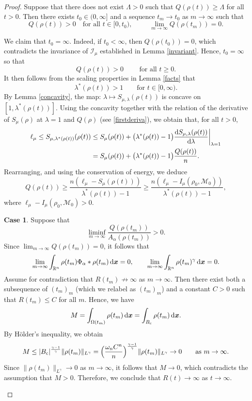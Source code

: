 \documentclass[reqno,11pt]{amsart}
\numberwithin{equation}{section}
\theoremstyle{definition}
\newtheorem{case}{Case}
\def\d{{\rm d}}
\def\dd{{\, \rm d}}
\begin{document}
\begin{proof}
Suppose that there does not exist $\Lambda > 0$ such that $Q(\rho(t)) \geq \Lambda$ 
for all $t>0$. Then there exists
$t_0 \in (0,\infty]$ and a sequence $t_m \to t_0$ as $m \to \infty$ such that 
$$
Q(\rho(t))> 0 \,\,\,\,\mbox{ for all $t \in [0,t_0)$}, \qquad\,\,\, 
\lim_{m \to \infty} Q(\rho(t_m)) = 0.
$$

We claim that $t_0 = \infty$. Indeed, if $t_0 < \infty$, then $Q(\rho(t_0)) = 0$, 
which contradicts the invariance of $\mathcal{I}_\mu$ established 
in Lemma \ref{invariant}. 
Hence, $t_0=\infty$ so that
$$
Q(\rho(t))> 0 \qquad\mbox{ for all $t\ge 0$}.
$$
It then follows from the scaling properties in Lemma \ref{facts}
that 
$$
\lambda^*(\rho(t)) > 1 \qquad\mbox{for $t \in [0,\infty)$}.
$$
By Lemma \ref{concavity}, the map: $\lambda \mapsto S_{\mu,\lambda}(\rho(t))$ is concave 
on $[1,\lambda^*(\rho(t))]$. Using the concavity together with 
the relation of the derivative of $S_\mu(\rho)$ 
at $\lambda=1$
and $Q(\rho)$ (see \eqref{firstderiva}), we obtain that, for all $t > 0$,
    \begin{align*}
 \ell_\mu \leq S_{\mu, \lambda^*(\rho(t))}(\rho(t)) 
 &\leq S_\mu(\rho(t)) 
 + \big(\lambda^*(\rho(t)) - 1\big)\frac{\d S_{\mu,\lambda}(\rho(t))}{\d \lambda} \bigg |_{\lambda = 1}\\ 
 &= S_\mu(\rho(t)) + \big(\lambda^*(\rho(t)) - 1\big) \frac{Q(\rho(t))}{n}.
    \end{align*}
    Rearranging, and using the conservation of energy, we deduce
    \begin{equation}\label{lamb}
    Q(\rho(t)) \geq \frac{n(\ell_\mu - S_\mu(\rho(t)))}{\lambda^*(\rho(t)) - 1} \geq \frac{n(\ell_\mu - I_\mu(\rho_0,\mathcal{M}_0))}{\lambda^*(\rho(t)) - 1},
    \end{equation}
where $\ell_\mu - I_\mu(\rho_0,\mathcal{M}_0) > 0$.
    

\begin{case}
Suppose that
    \begin{equation*}
 \liminf_{m \to \infty} \frac{Q(\rho(t_m))}{A_\alpha(\rho(t_m))} > 0.
    \end{equation*}
Since $\lim_{m \to \infty} Q(\rho(t_m)) = 0$, it follows that 
$$
\lim_{m \to \infty}\int_{\mathbb R^n}\rho(t_m)\Phi_\alpha*\rho(t_m)\dd \boldsymbol{x} = 0,
\qquad \lim_{m \to \infty} \int_{\mathbb{R}^n} \rho(t_m)^\gamma \dd \boldsymbol{x} = 0.
$$
Assume for contradiction that $R(t_m) \not \to \infty$ as $m \to \infty$. 
Then there exist both a subsequence of $(t_m)_m$ (which we relabel as $(t_m)_m$) and a constant 
$C>0$ such that $R(t_m) \leq C$ for all $m$.
Hence, we have
    \[
    M = \int_{\Omega(t_m)} \rho(t_m) \dd \boldsymbol{x} = \int_{B_{\rm c}} \rho(t_m) \dd \boldsymbol{x}. 
    \]
By H\"{o}lder's inequality, we obtain    
\[ 
M\le |B_{\rm c}|^{\frac{\gamma-1}{\gamma}}    
    \|\rho(t_m)\|_{L^\gamma} 
   =\Big(\frac{\omega_n C^{n}}{n}\Big)^\frac{\gamma - 1} {\gamma} \|\rho(t_m)\|_{L^\gamma} 
    \rightarrow 0\qquad \mbox{as $m \to \infty$}. 
    \]
Since $\|\rho(t_m)\|_{L^\gamma}\to 0$ as $m\to \infty$, 
it follows that $M\to 0$, which contradicts the assumption that $M>0$.
Therefore, we conclude that
$R(t) \to \infty$ as $t \to \infty$.
\end{case}


\end{proof}
\end{document}
